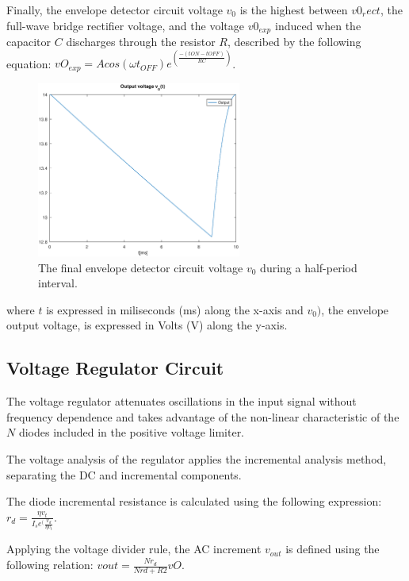 Finally, the envelope detector circuit voltage $v_0$ is the highest between $v0_rect$, the full-wave bridge rectifier voltage, and the voltage $v0_{exp}$ induced when the capacitor $C$ discharges through the resistor $R$, described by the following equation: $vO_{exp}=Acos(\omega t_{OFF})e^(\frac{-({tON}-{tOFF})}{RC})$.

\begin{figure}[H] \centering
\includegraphics[width=0.6\textwidth]{envelope.eps}
\caption{The final envelope detector circuit voltage $v_0$ during a half-period interval.}
\label{fig:envelope}
\end{figure}

where $t$ is expressed in miliseconds (ms) along the x-axis and 
$v_0)$, the envelope output voltage, is expressed in Volts (V) along the y-axis.

\subsection{Voltage Regulator Circuit}
\label{subsec:regulator}

The voltage regulator attenuates oscillations in the input signal without frequency dependence and takes advantage of the non-linear characteristic of the $N$ diodes included in the positive voltage limiter. 

The voltage analysis of the regulator applies the incremental analysis method, separating the DC and incremental components.

The diode incremental resistance is calculated using the following expression: $r_d=\frac{\eta v_t}{I_s e^(\frac{v_d}{\eta v_t}}$.

Applying the voltage divider rule, the AC increment $v_{out}$ is defined using the following relation: $vout=\frac{N r_d}{N rd+R2}vO$.

